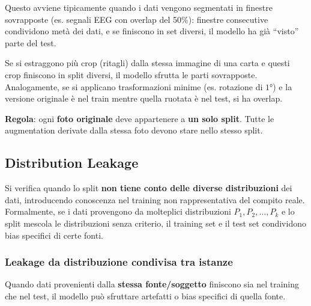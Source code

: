 \documentclass[a4paper,12pt]{article}
\begin{document}
Questo avviene tipicamente quando i dati vengono segmentati in finestre sovrapposte (es. segnali EEG con overlap del 50\%): finestre consecutive condividono metà dei dati, e se finiscono in set diversi, il modello ha già ``visto'' parte del test.

\begin{esempio}
Se si estraggono più crop (ritagli) dalla stessa immagine di una carta e questi crop finiscono in split diversi, il modello sfrutta le parti sovrapposte. Analogamente, se si applicano trasformazioni minime (es. rotazione di $1°$) e la versione originale è nel train mentre quella ruotata è nel test, si ha overlap.

\textbf{Regola}: ogni \textbf{foto originale} deve appartenere a \textbf{un solo split}. Tutte le augmentation derivate dalla stessa foto devono stare nello stesso split.
\end{esempio}

\subsection{Distribution Leakage}

Si verifica quando lo split \textbf{non tiene conto delle diverse distribuzioni} dei dati, introducendo conoscenza nel training non rappresentativa del compito reale. Formalmente, se i dati provengono da molteplici distribuzioni $P_1, P_2, \ldots, P_k$ e lo split mescola le distribuzioni senza criterio, il training set e il test set condividono bias specifici di certe fonti.

\subsubsection{Leakage da distribuzione condivisa tra istanze}

Quando dati provenienti dalla \textbf{stessa fonte/soggetto} finiscono sia nel training che nel test, il modello può sfruttare artefatti o bias specifici di quella fonte.
\end{document}
